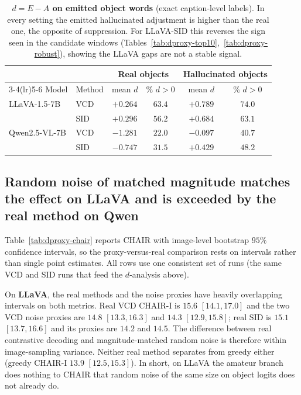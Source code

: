 \begin{table}[t]
\centering
\small
\setlength{\tabcolsep}{5pt}
\caption{\textbf{$d = E - A$ on emitted object words} (exact caption-level
labels). In every setting the emitted hallucinated adjustment is higher than the
real one, the opposite of suppression. For LLaVA-SID this reverses the sign seen
in the candidate windows (Tables~\ref{tab:dproxy-top10},~\ref{tab:dproxy-robust}),
showing the LLaVA gaps are not a stable signal.}
\label{tab:dproxy-emitted}
\begin{tabular}{ll cc cc}
\toprule
& & \multicolumn{2}{c}{Real objects} & \multicolumn{2}{c}{Hallucinated objects} \\
\cmidrule(lr){3-4}\cmidrule(lr){5-6}
Model & Method & mean $d$ & \% $d\!>\!0$ & mean $d$ & \% $d\!>\!0$ \\
\midrule
LLaVA-1.5-7B & VCD & $+0.264$ & $63.4$ & $+0.789$ & $74.0$ \\
 & SID & $+0.296$ & $56.2$ & $+0.684$ & $63.1$ \\
Qwen2.5-VL-7B & VCD & $-1.281$ & $22.0$ & $-0.097$ & $40.7$ \\
 & SID & $-0.747$ & $31.5$ & $+0.429$ & $48.2$ \\
\bottomrule
\end{tabular}
\end{table}

\subsection{Random noise of matched magnitude matches the effect on LLaVA and is exceeded by the real method on Qwen}
\label{subsec:dproxy-res-proxy}

Table~\ref{tab:dproxy-chair} reports CHAIR with image-level bootstrap $95\%$
confidence intervals, so the proxy-versus-real comparison rests on intervals
rather than single point estimates. All rows use one consistent set of runs (the
same VCD and SID runs that feed the $d$-analysis above).

On \textbf{LLaVA}, the real methods and the noise proxies have heavily
overlapping intervals on both metrics. Real VCD CHAIR-I is $15.6$ $[14.1, 17.0]$
and the two VCD noise proxies are $14.8$ $[13.3, 16.3]$ and $14.3$ $[12.9,
15.8]$; real SID is $15.1$ $[13.7, 16.6]$ and its proxies are $14.2$ and $14.5$.
The difference between real contrastive decoding and magnitude-matched random
noise is therefore within image-sampling variance. Neither real method separates
from greedy either (greedy CHAIR-I $13.9$ $[12.5, 15.3]$). In short, on LLaVA the
amateur branch does nothing to CHAIR that random noise of the same size on object
logits does not already do.

